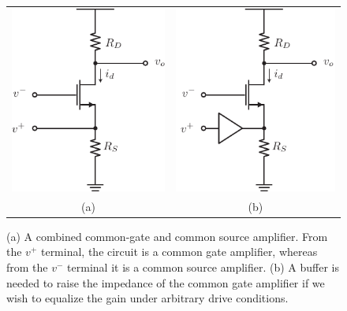 \begin{figure}[H]
\centering
\begin{tabular}{cc}
\includegraphics[scale=1.15]{amp_diff_CS_CG} &
\includegraphics[scale=1.15]{amp_diff_CS_CG_buffer}\\
(a) & (b)\\
\end{tabular}
\caption{(a) A combined common-gate and common source amplifier.  From the $v^+$ terminal, the circuit is a common gate amplifier, whereas from the $v^-$ terminal it is a common source amplifier.  (b) A buffer is needed to raise the impedance of the common gate amplifier if we wish to equalize the gain under arbitrary drive conditions.}
\label{fig:amp_diff_CS_CG}
\end{figure}
